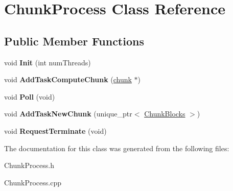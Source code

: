 \hypertarget{classChunkProcess}{\section{\-Chunk\-Process \-Class \-Reference}
\label{classChunkProcess}
}
\subsection*{\-Public \-Member \-Functions}
\begin{DoxyCompactItemize}
\item 
\hypertarget{classChunkProcess_ad0f2b2ee2eddd45b315997ed40417be9}{void {\bfseries \-Init} (int num\-Threads)}\label{classChunkProcess_ad0f2b2ee2eddd45b315997ed40417be9}

\item 
\hypertarget{classChunkProcess_a64eb2420d93d3c526117f699c7ffc03c}{void {\bfseries \-Add\-Task\-Compute\-Chunk} (\hyperlink{structchunk}{chunk} $\ast$)}\label{classChunkProcess_a64eb2420d93d3c526117f699c7ffc03c}

\item 
\hypertarget{classChunkProcess_aa48298522a70877bea81dae4e9772e27}{void {\bfseries \-Poll} (void)}\label{classChunkProcess_aa48298522a70877bea81dae4e9772e27}

\item 
\hypertarget{classChunkProcess_a2a7c5b8db6530dd24cf5d1c30f8ae2fc}{void {\bfseries \-Add\-Task\-New\-Chunk} (unique\-\_\-ptr$<$ \hyperlink{structChunkBlocks}{\-Chunk\-Blocks} $>$)}\label{classChunkProcess_a2a7c5b8db6530dd24cf5d1c30f8ae2fc}

\item 
\hypertarget{classChunkProcess_ae121487fd3afdc247d71a58c4ef8226e}{void {\bfseries \-Request\-Terminate} (void)}\label{classChunkProcess_ae121487fd3afdc247d71a58c4ef8226e}

\end{DoxyCompactItemize}


\-The documentation for this class was generated from the following files\-:\begin{DoxyCompactItemize}
\item 
\-Chunk\-Process.\-h\item 
\-Chunk\-Process.\-cpp\end{DoxyCompactItemize}
